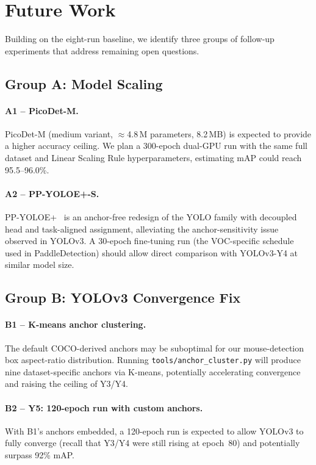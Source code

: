 \section{Future Work}
\label{sec:future}

Building on the eight-run baseline, we identify three groups of
follow-up experiments that address remaining open questions.

\subsection{Group A: Model Scaling}

\paragraph{A1 -- PicoDet-M.}
PicoDet-M (medium variant, $\approx$4.8\,M parameters, 8.2\,MB) is
expected to provide a higher accuracy ceiling.  We plan a 300-epoch
dual-GPU run with the same full dataset and Linear Scaling Rule
hyperparameters, estimating mAP could reach 95.5--96.0\%.

\paragraph{A2 -- PP-YOLOE+-S.}
PP-YOLOE+~\citep{xu2022ppyoloe} is an anchor-free redesign of the YOLO
family with decoupled head and task-aligned assignment, alleviating the
anchor-sensitivity issue observed in YOLOv3.  A 30-epoch fine-tuning
run (the VOC-specific schedule used in PaddleDetection) should allow
direct comparison with YOLOv3-Y4 at similar model size.

\subsection{Group B: YOLOv3 Convergence Fix}

\paragraph{B1 -- K-means anchor clustering.}
The default COCO-derived anchors may be suboptimal for our
mouse-detection box aspect-ratio distribution.  Running
\texttt{tools/anchor\_cluster.py} will produce nine dataset-specific
anchors via K-means, potentially accelerating convergence and raising
the ceiling of Y3/Y4.

\paragraph{B2 -- Y5: 120-epoch run with custom anchors.}
With B1's anchors embedded, a 120-epoch run is expected to allow
YOLOv3 to fully converge (recall that Y3/Y4 were still rising at
epoch~80) and potentially surpass 92\% mAP.

